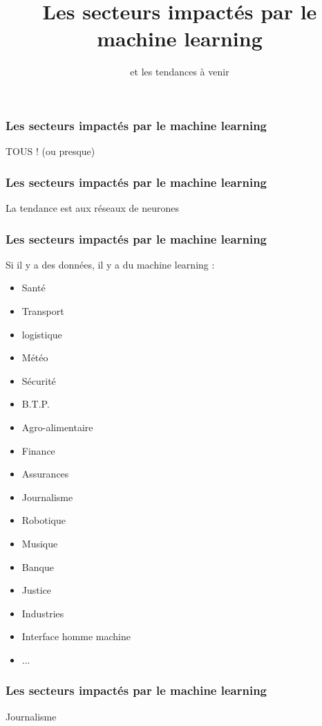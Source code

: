 \documentclass{formation}
\title{Les secteurs impactés par le machine learning}
\subtitle{et les tendances à venir}
\begin{document}
\maketitle

\begin{frame}
  \frametitle{Les secteurs impactés par le machine learning}
  \begin{center}
    \huge TOUS ! (ou presque)
  \end{center}
\end{frame}

\begin{frame}
  \frametitle{Les secteurs impactés par le machine learning}
  La tendance est aux réseaux de neurones
\end{frame}

\begin{frame}
  \frametitle{Les secteurs impactés par le machine learning}
  Si il y a des données, il y a du machine learning :
  \newline
  \newline
  \begin{minipage}[c]{0.49\linewidth}
    \begin{itemize}
    \item Santé 
    \item Transport
    \item logistique
    \item Météo
    \item Sécurité
    \item B.T.P.
    \item Agro-alimentaire    
    \item Finance
    \item Assurances
    \end{itemize}
  \end{minipage}\hfill
  \begin{minipage}[c]{0.49\linewidth}
    \begin{itemize}
    \item Journalisme
    \item Robotique
    \item Musique
    \item Banque
    \item Justice
    \item Industries
    \item Interface homme machine
    \item ...
    \end{itemize}
  \end{minipage}\hfill
\end{frame}

\begin{frame}
  \frametitle{Les secteurs impactés par le machine learning}
  Journalisme
\end{frame}
\end{document}
